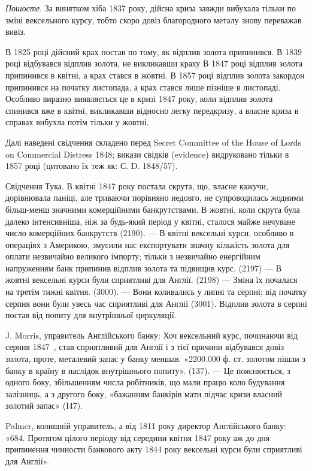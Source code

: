 
\emph{Пошосте}. За винятком хіба 1837 року, дійсна криза завжди вибухала
тільки по зміні вексельного курсу, тобто скоро довіз благородного металу знову
переважав вивіз.

В 1825 році дійсний крах постав по тому, як відплив золота припинився.
В 1839 році відбувався відплив золота, не викликавши краху В 1847 році
відплив золота припинився в квітні, а крах стався в жовтні. В 1857 році відплив
золота закордон припинився на початку листопада, а крах стався лише
пізніше в листопаді. Особливо виразно виявляється це в кризі 1847 року, коли
відплив золота спинився вже в квітні, викликавши відносно легку передкризу,
а власне криза в справах вибухла потім тільки у жовтні.

Далі наведені свідчення складено перед Secret Committee of the House of
Lords on Commercial Distress 1848; викази свідків (evidence) видруковано тільки
в 1857 році (цитовано їх теж як: С. D. 1848/57).

Свідчення Тука. В квітні 1847 року постала скрута, що, власне кажучи,
дорівнювала паніці, але триваючи порівняно недовго, не супроводилась жодними
більш-менш значними комерційними банкрутствами. В жовтні, коли скрута була
далеко інтенсивніша, ніж за будь-який період у квітні, сталося майже нечуване
число комерційних банкрутств (2190). — В квітні вексельні курси, особливо в операціях
з Америкою, змусили нас експортувати значну кількість золота для оплати
незвичайно великого імпорту; тільки з незвичайно енергійним напруженням банк
припинив відплив золота та підвищив курс. (2197) — В жовтні вексельні курси
були сприятливі для Англії. (2198) — Зміна їх почалася на третім тижні квітня.
(3000). — Вони коливались у липні та серпні; від початку серпня вони були
увесь час сприятливі для Англії (3001). Відплив золота в серпні постав від
попиту для внутрішньої циркуляції.

J. Morris, управитель Англійського банку: Хоч вексельний курс, починаючи
від серпня 1847~, став сприятливий для Англії і з тієї причини відбувався довіз
золота, проте, металевий запас у банку меншав. «2200.000 ф. ст. золотом пішли
з банку в країну в наслідок внутрішнього попиту». (137). — Це пояснюється,
з одного боку, збільшенням числа робітників, що мали працю коло будування
залізниць, а з другого боку, «бажанням банкірів мати підчас кризи власний
золотий запас» (І47).

Palmer, колишній управитель, а від 1811 року директор Англійського банку:
«684. Протягом цілого періоду від середини квітня 1847 року аж до
дня припинення чинности банкового акту 1844 року вексельні курси були
сприятливі для Англії».

